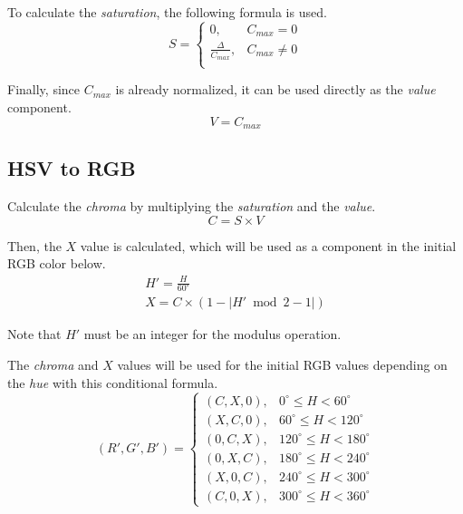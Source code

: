 \documentclass{article}
\begin{document}
To calculate the \textit{saturation}, the following formula is used.
\begin{equation*}
  S =
  \begin{cases}
    0,                      & C_{max} = 0 \\
    \frac{\Delta}{C_{max}}, & C_{max} \neq 0 \\
  \end{cases}
\end{equation*}

Finally, since $C_{max}$ is already normalized, it can be used directly as the
\textit{value} component.
\begin{equation*}
  V = C_{max}
\end{equation*}

\subsection{HSV to RGB}

Calculate the \textit{chroma} by multiplying the \textit{saturation} and the
\textit{value}.
\begin{equation*}
  C = S \times V
\end{equation*}

Then, the $X$ value is calculated, which will be used as a component in the
initial RGB color below.
\begin{gather*}
  H' = \frac{H}{60^\circ} \\
  X = C \times \left( 1 - \left| H' \bmod 2 - 1 \right| \right)
\end{gather*}

Note that $H'$ must be an integer for the modulus operation.

The \textit{chroma} and $X$ values will be used for the initial RGB values
depending on the \textit{hue} with this conditional formula.
\begin{equation*}
  \left( R', G', B' \right) =
  \begin{cases}
    (C, X, 0), & 0^\circ \leq H < 60^\circ \\
    (X, C, 0), & 60^\circ \leq H < 120^\circ \\
    (0, C, X), & 120^\circ \leq H < 180^\circ \\
    (0, X, C), & 180^\circ \leq H < 240^\circ \\
    (X, 0, C), & 240^\circ \leq H < 300^\circ \\
    (C, 0, X), & 300^\circ \leq H < 360^\circ
  \end{cases}
\end{equation*}
\end{document}

